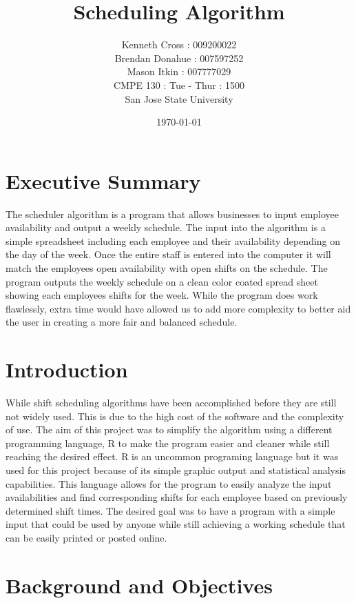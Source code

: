 \documentclass[a4paper,11pt]{article}
\author{Kenneth Cross : 009200022
        \\Brendan Donahue : 007597252
        \\Mason Itkin : 007777029
        \\CMPE 130 : Tue - Thur : 1500
        \\San Jose State University}
\title{\textbf{Scheduling Algorithm}}
\date{\today}
\begin{document}
\maketitle
\newpage
\tableofcontents
\newpage
{}
\setcounter{page}{1}

\section{Executive Summary}

The scheduler algorithm is a program that allows businesses to input employee availability and output a weekly schedule.  The input into the algorithm is a simple spreadsheet including each employee and their availability depending on the day of the week.  Once the entire staff is entered into the computer it will match the employees open availability with open shifts on the schedule.   The program outputs the weekly schedule on a clean color coated spread sheet showing each employees shifts for the week.  While the program does work flawlessly, extra time would have allowed us to add more complexity to better aid the user in creating a more fair and balanced schedule. 

\newpage

\section{Introduction} 
 

While shift scheduling algorithms have been accomplished before they are still not widely used.  This is due to the high cost of the software and the complexity of use.  The aim of this project was to simplify the algorithm using a different programming language, R to make the program easier and cleaner while still reaching the desired effect.  R is an uncommon programing language but it was used for this project because of its simple graphic output and statistical analysis capabilities.  This language allows for the program to easily analyze the input availabilities and find corresponding shifts for each employee based on previously determined shift times.  The desired goal was to have a program with a simple input that could be used by anyone while still achieving a working schedule that can be easily printed or posted online.

\section{Background and Objectives}
\end{document}
